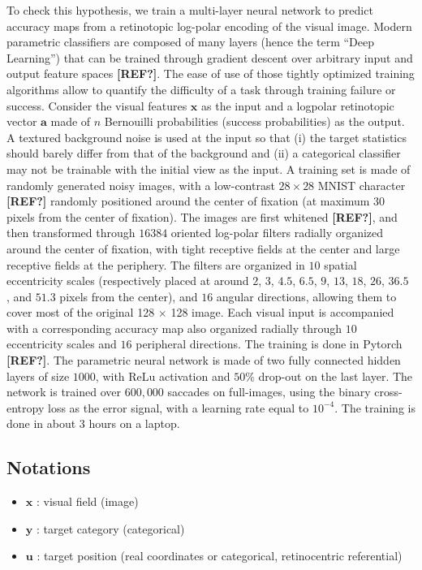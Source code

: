 To check this hypothesis, we train a multi-layer neural network to predict accuracy maps from a retinotopic log-polar encoding of the visual image. Modern parametric classifiers are composed of many layers (hence the term ``Deep Learning'') that can be trained through gradient descent over arbitrary input and output feature spaces  {\bf [REF?]}. The ease of use of those tightly optimized training algorithms allow to quantify the difficulty of a task through training failure or success. Consider the visual features  $\boldsymbol{x}$ as the input and a logpolar retinotopic vector $\boldsymbol{a}$ made of $n$ Bernouilli probabilities (success probabilities) as the output. A textured background noise is used at the input so that (i) the target statistics should barely differ from that of the background and (ii) a  categorical classifier may not be trainable with the initial view as the input. A training set is made of randomly generated noisy images, with a low-contrast $28\times 28$ MNIST character   {\bf [REF?]} randomly positioned around the center of fixation (at maximum $30$ pixels from the center of fixation). The images are first whitened  {\bf [REF?]}, and then transformed through $16384$ oriented log-polar filters radially organized around the center of fixation, with tight receptive fields at the center and large receptive fields at the periphery. The filters are organized in $10$ spatial eccentricity scales (respectively placed at around $2$, $3$, $4.5$, $6.5$, $9$, $13$, $18$, $26$, $36.5$ , and $51.3$ pixels from the center), and $16$ angular directions, allowing them to cover most of the original 128 $\times$ 128 image. Each visual input is accompanied with a corresponding accuracy map also organized radially through $10$ eccentricity scales and $16$ peripheral directions. The training is done in Pytorch  {\bf [REF?]}. The parametric neural network is made of two fully connected hidden layers of size $1000$, with ReLu activation and $50 \%$ drop-out on the last layer. The network is trained over $600,000$ saccades on full-images, using the binary cross-entropy loss as the error signal, with a learning rate equal to $10^{-4}$. The training is done in about 3 hours on a laptop.








\subsection{Notations}
\begin{itemize}
	\item $\boldsymbol{x}$ : visual field (image)
	\item $\boldsymbol{y}$ : target category (categorical)
	\item $\boldsymbol{u}$ : target position (real coordinates or categorical, retinocentric referential)

\end{itemize}

